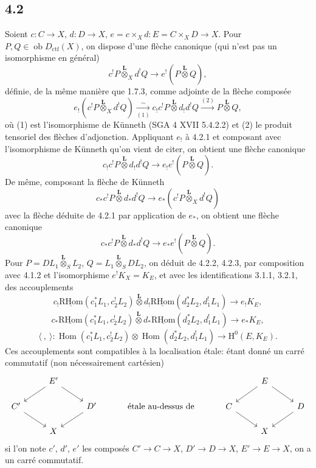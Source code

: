\documentclass[11pt]{article}
\renewcommand{\H}{\mathrm{H}}
\DeclareMathOperator{\Hom}{Hom}
\newcommand{\ob}{\operatorname{ob}}
\providecommand{\RHom}{\mathrm{RHom}}
\providecommand{\uRHom}{\underline{\RHom}}
\providecommand{\Dctf}{D_{\mathrm{ctf}}}
\providecommand{\Dctf}{D_{\mathrm{ctf}}}
\providecommand{\RHom}{\mathrm{RHom}}
\providecommand{\Hom}{\operatorname{Hom}}
\providecommand{\ob}{\operatorname{ob}}
\providecommand{\RHom}{\mathrm R\mathcal{H}om}
\providecommand{\RHom}{\mathrm{RHom}}
\providecommand{\Hom}{\operatorname{Hom}}
\begin{document}
\subsection*{4.2}
Soient $c:C\to X$, $d:D\to X$, $e=c\times_Xd:E=C\times_XD\to X$. Pour $P,Q\in\ob\Dctf(X)$, on dispose d'une flèche canonique (qui n'est pas un isomorphisme en général)
\begin{equation}
c^!P\overset{\mathbf L}{\otimes}_X d^!Q
\longrightarrow e^!(P\overset{\mathbf L}{\otimes}Q),
\tag{4.2.1}
\end{equation}
définie, de la même manière que 1.7.3, comme adjointe de la flèche composée
\[
e_!(c^!P\overset{\mathbf L}{\otimes}_X d^!Q)
\xrightarrow[(1)]{\sim}
 c_!c^!P\overset{\mathbf L}{\otimes}d_!d^!Q
\xrightarrow{(2)} P\overset{\mathbf L}{\otimes}Q,
\]
où (1) est l'isomorphisme de Künneth (SGA 4 XVII 5.4.2.2) et (2) le produit tensoriel des flèches d'adjonction. Appliquant $e_!$ à 4.2.1 et composant avec l'isomorphisme de Künneth qu'on vient de citer, on obtient une flèche canonique
\begin{equation}
c_!c^!P\overset{\mathbf L}{\otimes}d_!d^!Q
\longrightarrow e_!e^!(P\overset{\mathbf L}{\otimes}Q).
\tag{4.2.2}
\end{equation}
De même, composant la flèche de Künneth
\[
c_*c^!P\overset{\mathbf L}{\otimes}d_*d^!Q
\longrightarrow e_*(c^!P\overset{\mathbf L}{\otimes}_X d^!Q)
\]
avec la flèche déduite de 4.2.1 par application de $e_*$, on obtient une flèche canonique
\begin{equation}
c_*c^!P\overset{\mathbf L}{\otimes}d_*d^!Q
\longrightarrow e_*e^!(P\overset{\mathbf L}{\otimes}Q).
\tag{4.2.3}
\end{equation}
Pour $P=DL_1\overset{\mathbf L}{\otimes}_S L_2$, $Q=L_1\overset{\mathbf L}{\otimes}_S DL_2$, on déduit de 4.2.2, 4.2.3, par composition avec 4.1.2 et l'isomorphisme $e^!K_X=K_E$, et avec les identifications 3.1.1, 3.2.1, des accouplements
\begin{equation}
c_!\uRHom(c_1^*L_1,c_2^!L_2)\overset{\mathbf L}{\otimes}
 d_!\uRHom(d_2^*L_2,d_1^!L_1)
\longrightarrow e_!K_E,
\tag{4.2.4}
\end{equation}
\begin{equation}
c_*\uRHom(c_1^*L_1,c_2^!L_2)\overset{\mathbf L}{\otimes}
 d_*\uRHom(d_2^*L_2,d_1^!L_1)
\longrightarrow e_*K_E,
\tag{4.2.4'}
\end{equation}
\begin{equation}
\langle\ ,\ \rangle:
\Hom(c_1^*L_1,c_2^!L_2)\otimes\Hom(d_2^*L_2,d_1^!L_1)
\longrightarrow \H^0(E,K_E).
\tag{4.2.5}
\end{equation}
Ces accouplements sont compatibles à la localisation étale: étant donné un carré commutatif (non nécessairement cartésien)
\[
\begin{tikzcd}[column sep=2.5em,row sep=1.5em]
& E' \arrow[dl] \arrow[dr] & && & E \arrow[dl] \arrow[dr] & \\
C' \arrow[dr] && D' \arrow[dl] & \text{ étale au-dessus de } & C \arrow[dr] && D \arrow[dl] \\
& X &&&& X &
\end{tikzcd}
\]
si l'on note $c'$, $d'$, $e'$ les composés $C'\to C\to X$, $D'\to D\to X$, $E'\to E\to X$, on a un carré commutatif.
\end{document}
